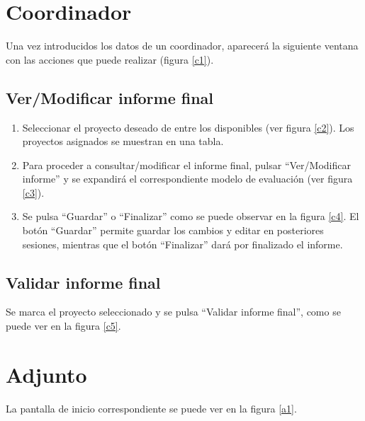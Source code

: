 \documentclass[12pt,a4paper,spanish,twoside]{book}
\begin{document}
\section{Coordinador}
Una vez introducidos los datos de un coordinador, aparecerá la siguiente 
ventana con las acciones que puede realizar (figura \ref{c1}).

\subsection{Ver/Modificar informe final}
\begin{enumerate}
\item Seleccionar el proyecto deseado de entre los disponibles (ver figura 
  \ref{c2}). Los proyectos asignados se muestran en una tabla.
  

\item Para proceder a consultar/modificar el informe final, pulsar 
  ``Ver/Modificar informe'' y se expandirá el correspondiente modelo de 
  evaluación (ver figura \ref{c3}).


\item Se pulsa ``Guardar'' o ``Finalizar'' como se puede observar en la figura 
  \ref{c4}. El botón ``Guardar'' permite guardar los cambios y editar en 
  posteriores sesiones, mientras que el botón ``Finalizar'' dará por finalizado 
  el informe.
  
\end{enumerate}

\subsection{Validar informe final}
Se marca el proyecto seleccionado y se pulsa ``Validar informe final'', como se 
puede ver en la figura \ref{c5}.

\section{Adjunto}
La pantalla de inicio correspondiente se puede ver en la figura \ref{a1}.
\end{document}
